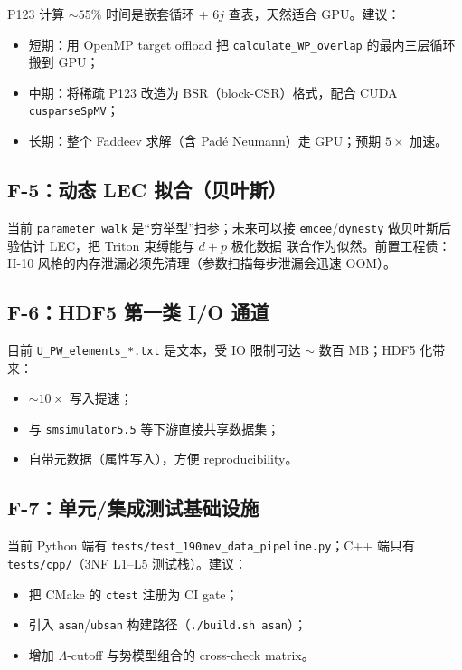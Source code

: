 P123 计算 \(\sim 55\%\) 时间是嵌套循环 + 6\(j\) 查表，天然适合 GPU。建议：
\begin{itemize}
  \item 短期：用 OpenMP target offload 把 \texttt{calculate\_WP\_overlap} 的最内三层循环搬到 GPU；
  \item 中期：将稀疏 P123 改造为 BSR（block-CSR）格式，配合 CUDA \texttt{cusparseSpMV}；
  \item 长期：整个 Faddeev 求解（含 Padé Neumann）走 GPU；预期 \(5\times\) 加速。
\end{itemize}

\subsection{F-5：动态 LEC 拟合（贝叶斯）}

当前 \texttt{parameter\_walk} 是“穷举型”扫参；未来可以接 \texttt{emcee}/\texttt{dynesty} 做贝叶斯后验估计 LEC，把 Triton 束缚能与 \(d+p\) 极化数据
联合作为似然。前置工程债：H-10 风格的内存泄漏必须先清理（参数扫描每步泄漏会迅速 OOM）。

\subsection{F-6：HDF5 第一类 I/O 通道}

目前 \texttt{U\_PW\_elements\_*.txt} 是文本，受 IO 限制可达 \(\sim\) 数百 MB；HDF5 化带来：
\begin{itemize}
  \item \(\sim 10\times\) 写入提速；
  \item 与 \texttt{smsimulator5.5} 等下游直接共享数据集；
  \item 自带元数据（属性写入），方便 reproducibility。
\end{itemize}

\subsection{F-7：单元/集成测试基础设施}

当前 Python 端有 \texttt{tests/test\_190mev\_data\_pipeline.py}；C++ 端只有 \texttt{tests/cpp/}（3NF L1–L5 测试栈）。建议：
\begin{itemize}
  \item 把 CMake 的 \texttt{ctest} 注册为 CI gate；
  \item 引入 \texttt{asan}/\texttt{ubsan} 构建路径（\texttt{./build.sh asan}）；
  \item 增加 \(\Lambda\)-cutoff 与势模型组合的 cross-check matrix。
\end{itemize}

